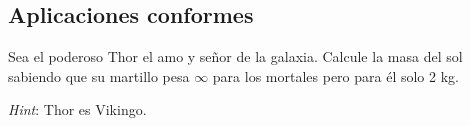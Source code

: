 \begin{problem}

\solution

\end{problem}



\subsection{Aplicaciones conformes}

\begin{problem}

\solution

\end{problem}

\begin{problem}

\solution

\end{problem}

\begin{problem}

\solution

\end{problem}

\begin{problem}

\solution

\end{problem}

\begin{problem}

\solution

\end{problem}

\begin{problem}
Sea el poderoso Thor el amo y señor de la galaxia. Calcule la masa del sol sabiendo que su martillo pesa $\infty$ para los mortales pero para él solo 2 kg.

{\it Hint}: Thor es Vikingo.
\solution

\end{problem}
